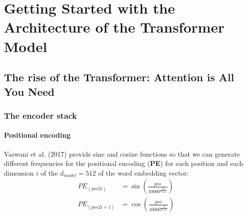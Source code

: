 \chapter{Getting Started with the Architecture of the Transformer Model\label{ch02}}
\section{The rise of the Transformer: Attention is All You Need}
\subsection{The encoder stack}
\subsubsection{Positional encoding}
Vaswani et al. (2017) provide sine and cosine functions so that we can generate different frequencies for the positional encoding (\textbf{PE}) for each position and each dimension $i$ of the $d_{model} = 512$ of the word embedding vector:
\begin{equation}
    \begin{aligned}
        PE_{(pos 2i)}   & =\sin\left(\frac{pos}{10000^{\frac{2i}{d_{model}}}}\right) \\
        PE_{(pos 2i+1)} & =\cos\left(\frac{pos}{10000^{\frac{2i}{d_{model}}}}\right) \\
    \end{aligned}
\end{equation}